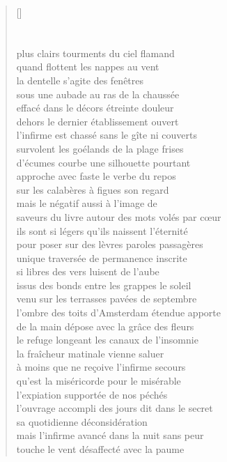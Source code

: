 \documentclass[a4paper, titlepage, twoside, 12pt]{book}
\begin{document}
\begin{verse}[\versewidth]
\section*{}
plus clairs tourments du ciel flamand\\
quand flottent les nappes au vent\\
la dentelle s'agite des fenêtres\\
sous une aubade au ras de la chaussée\\
effacé dans le décors étreinte douleur\\
dehors le dernier établissement ouvert\\
l'infirme est chassé sans le gîte ni couverts\\
survolent les goélands de la plage frises\\
d'écumes courbe une silhouette pourtant\\
approche avec faste le verbe du repos\\
sur les calabères à figues son regard\\
mais le négatif aussi à l'image de\\
saveurs du livre autour des mots volés par c\oe ur\\
ils sont si légers qu'ils naissent l'éternité\\
pour poser sur des lèvres paroles passagères\\
unique traversée de permanence inscrite\\
si libres des vers luisent de l'aube\\
issus des bonds entre les grappes le soleil\\
venu sur les terrasses pavées de septembre\\
l'ombre des toits d'Amsterdam étendue apporte\\
de la main dépose avec la grâce des fleurs\\
le refuge longeant les canaux de l'insomnie\\
la fraîcheur matinale vienne saluer\\
à moins que ne reçoive l'infirme secours\\ 
qu'est la miséricorde pour le misérable \\
l'expiation supportée de nos péchés\\
l'ouvrage accompli des jours dit dans le secret\\
sa quotidienne déconsidération\\
mais l'infirme avancé dans la nuit sans peur\\
touche le vent désaffecté avec la paume\\

\end{verse}
\end{document}
